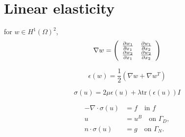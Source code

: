 \chapter{Linear elasticity}



for $w \in H^1(\Omega)^2$, 
\begin{equation*}
  \nabla w = \bmat{cc}
  \pp{w_1}{x_1} & \pp{w_1}{x_2} \\
  \pp{w_2}{x_1} & \pp{w_2}{x_2}
  \emat
\end{equation*}


\begin{equation*}
  \epsilon(w) = \frac{1}{2} (\nabla w + \nabla w^T)
\end{equation*}

\begin{equation*}
  \sigma(u) = 2 \mu \epsilon(u) + \lambda \text{tr}(\epsilon(u)) I
\end{equation*}

\begin{align*}
  - \nabla \cdot \sigma(u) &= f \quad \text{in } f \\
  u &= u^B \quad \text{on } \Gamma_{D}, \\
  n \cdot \sigma(u) &= g \quad \text{on } \Gamma_{N}.
\end{align*}

